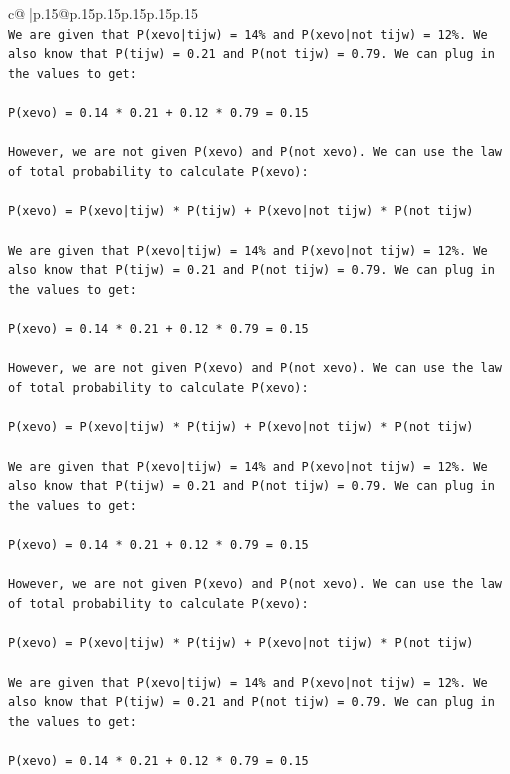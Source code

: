 \documentclass{article}
\begin{document}
{\begin{supertabular}{c@{$\;$}|p{.15\linewidth}@{}p{.15\linewidth}p{.15\linewidth}p{.15\linewidth}p{.15\linewidth}p{.15\linewidth}}
{{{\\ 
\texttt{We are given that P(xevo|tijw) = 14\% and P(xevo|not tijw) = 12\%. We also know that P(tijw) = 0.21 and P(not tijw) = 0.79. We can plug in the values to get:} \\
\\ 
\texttt{P(xevo) = 0.14 * 0.21 + 0.12 * 0.79 = 0.15} \\
\\ 
\texttt{However, we are not given P(xevo) and P(not xevo). We can use the law of total probability to calculate P(xevo):} \\
\\ 
\texttt{P(xevo) = P(xevo|tijw) * P(tijw) + P(xevo|not tijw) * P(not tijw)} \\
\\ 
\texttt{We are given that P(xevo|tijw) = 14\% and P(xevo|not tijw) = 12\%. We also know that P(tijw) = 0.21 and P(not tijw) = 0.79. We can plug in the values to get:} \\
\\ 
\texttt{P(xevo) = 0.14 * 0.21 + 0.12 * 0.79 = 0.15} \\
\\ 
\texttt{However, we are not given P(xevo) and P(not xevo). We can use the law of total probability to calculate P(xevo):} \\
\\ 
\texttt{P(xevo) = P(xevo|tijw) * P(tijw) + P(xevo|not tijw) * P(not tijw)} \\
\\ 
\texttt{We are given that P(xevo|tijw) = 14\% and P(xevo|not tijw) = 12\%. We also know that P(tijw) = 0.21 and P(not tijw) = 0.79. We can plug in the values to get:} \\
\\ 
\texttt{P(xevo) = 0.14 * 0.21 + 0.12 * 0.79 = 0.15} \\
\\ 
\texttt{However, we are not given P(xevo) and P(not xevo). We can use the law of total probability to calculate P(xevo):} \\
\\ 
\texttt{P(xevo) = P(xevo|tijw) * P(tijw) + P(xevo|not tijw) * P(not tijw)} \\
\\ 
\texttt{We are given that P(xevo|tijw) = 14\% and P(xevo|not tijw) = 12\%. We also know that P(tijw) = 0.21 and P(not tijw) = 0.79. We can plug in the values to get:} \\
\\ 
\texttt{P(xevo) = 0.14 * 0.21 + 0.12 * 0.79 = 0.15} \\
}}}
\end{supertabular}}
\end{document}
